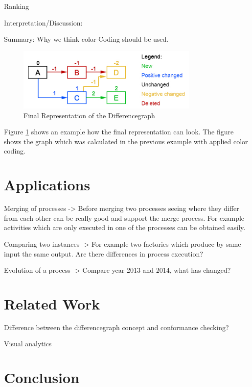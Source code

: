 \documentclass{llncs}
\begin{document}
Ranking


Interpretation/Discussion:

Summary:
Why we think color-Coding should be used.

\begin{figure}
	\centering
	\includegraphics[width=0.8\textwidth]{Images/ColorCodedGraph.PNG}
	\caption{Final Representation of the Differencegraph}
	\label{fig:DiffGraphVisualization}
\end{figure}

Figure \ref{fig:DiffGraphVisualization} shows an example how the final representation can look. The figure shows the graph which was calculated in the previous example with applied color coding.



\section{Applications}  %
\label{sec:Applications}

Merging of processes -> Before merging two processes seeing where they differ from each other can be really good and support the merge process. For example activities which are only executed in one of the processes can be obtained easily.

Comparing two instances -> For example two factories which produce by same input the same output. Are there differences in process execution?

Evolution of a process -> Compare year 2013 and 2014, what has changed?


\section{Related Work}  %
\label{sec:RelatedWork}

Difference between the differencegraph concept and conformance checking?

Visual analytics


\section{Conclusion} %
\label{sec:Conclusion}




\end{document}
